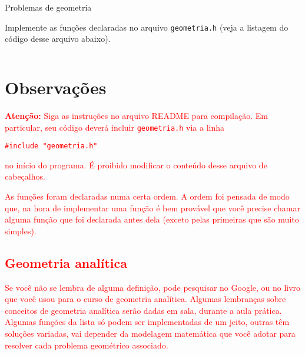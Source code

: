 \documentclass[12pt,a4paper]{article}
\begin{document}
\begin{center}
  {\LARGE Problemas de geometria}
\end{center}
\bigskip 

Implemente as funções declaradas no arquivo \texttt{geometria.h} (veja a listagem do código desse arquivo abaixo).

\inputminted{C}{geometria.h}

\section* {Observações}

\textcolor{red}{\textbf{Atenção:} Siga as instruções no arquivo
README para compilação. Em particular, seu código deverá incluir
\texttt{geometria.h} via a linha
\begin{verbatim}
#include "geometria.h"
\end{verbatim}
no início do programa. É proibido modificar o conteúdo desse arquivo de cabeçalhos. 

As funções foram declaradas numa certa ordem. A ordem foi pensada de
modo que, na hora de implementar uma função é bem provável que você
precise chamar alguma função que foi declarada antes dela (exceto
pelas primeiras que são muito simples).

\subsection* {Geometria analítica}
Se você não se lembra de alguma definição, pode pesquisar no Google,
ou no livro que você usou para o curso de geometria analítica.
Algumas lembranças sobre conceitos de geometria analítica serão dadas
em sala, durante a aula prática. Algumas funções da lista só podem ser
implementadas de um jeito, outras têm soluções variadas, vai depender
da modelagem matemática que você adotar para resolver cada problema
geométrico associado.

}
\end{document}
